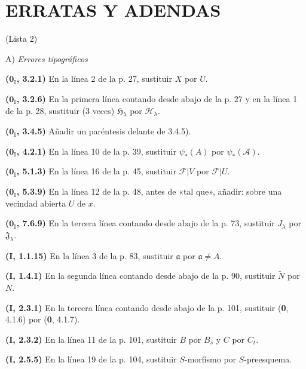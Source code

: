 \documentclass[10pt,oneside,openany]{book}
\theoremstyle{egaenv}\newtheorem*{env}{---}
\theoremstyle{egastatement}
\theoremstyle{egadescription}
\newcommand{\oldpage}[2][]{\marginnote{\normalfont\scriptsize\textbf{#1}\,|\,#2}\ignorespaces}
\begin{document}
\clearpage
\oldpage[III]{216}
\thispagestyle{empty}
\null
\clearpage

\oldpage[III]{217}
\section*{ERRATAS Y ADENDAS}
\begin{center}
(Lista 2)

\medskip
A) \emph{Errores tipográficos}
\end{center}

\noindent\textbf{($\mathbf{0}_{\mathrm I}$, 3.2.1)} En la línea 2 de la p. 27, sustituir
$X$ por $U$.

\noindent\textbf{($\mathbf{0}_{\mathrm I}$, 3.2.6)} En la primera línea contando desde
abajo de la p. 27 y en la línea 1 de la p. 28, sustituir (3 veces)
$\mathfrak H_\lambda$ por $\mathscr H_\lambda$.

\noindent\textbf{($\mathbf{0}_{\mathrm I}$, 3.4.5)} Añadir un paréntesis delante de
3.4.5).

\noindent\textbf{($\mathbf{0}_{\mathrm I}$, 4.2.1)} En la línea 10 de la p. 39,
sustituir $\psi_*(A)$ por $\psi_*(\mathscr A)$.

\noindent\textbf{($\mathbf{0}_{\mathrm I}$, 5.1.3)} En la línea 16 de la p. 45,
sustituir $\mathscr F|V$ por $\mathscr F|U$.

\noindent\textbf{($\mathbf{0}_{\mathrm I}$, 5.3.9)} En la línea 12 de la p. 48, antes
de «tal que», añadir: sobre una vecindad abierta $U$ de $x$.

\noindent\textbf{($\mathbf{0}_{\mathrm I}$, 7.6.9)} En la tercera línea contando desde
abajo de la p. 73, sustituir $J_\lambda$ por $\mathfrak J_\lambda$.

\noindent\textbf{(I, 1.1.15)} En la línea 3 de la p. 83, sustituir
$\mathfrak a$ por $\mathfrak a\ne A$.

\noindent\textbf{(I, 1.4.1)} En la segunda línea contando desde abajo de la
p. 90, sustituir $\widetilde N$ por $N$.

\noindent\textbf{(I, 2.3.1)} En la tercera línea contando desde abajo de la
p. 101, sustituir (\textbf 0, 4.1.6) por (\textbf 0, 4.1.7).

\noindent\textbf{(I, 2.3.2)} En la línea 11 de la p. 101, sustituir $B$ por
$B_s$ y $C$ por $C_t$.

\noindent\textbf{(I, 2.5.5)} En la línea 19 de la p. 104, sustituir
$S$-morfismo por $S$-preesquema.
\end{document}
